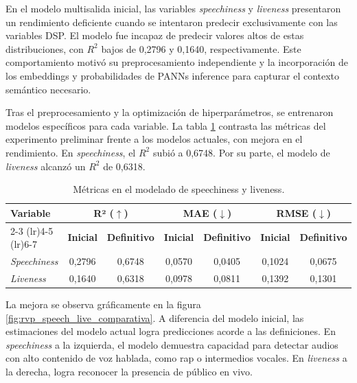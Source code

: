 En el modelo multisalida inicial, las variables \textit{speechiness} y \textit{liveness} presentaron un rendimiento deficiente cuando se intentaron predecir exclusivamente con las variables DSP. El modelo fue incapaz de predecir valores altos de estas distribuciones, con $R^2$ bajos de 0,2796 y 0,1640, respectivamente. Este comportamiento motivó su preprocesamiento independiente y la incorporación de los embeddings y probabilidades de PANNs inference para capturar el contexto semántico necesario.

Tras el preprocesamiento y la optimización de hiperparámetros, se entrenaron modelos específicos para cada variable. La tabla \ref{tab:comparativa_speech_live} contrasta las métricas del experimento preliminar frente a los modelos actuales, con mejora en el rendimiento. En \textit{speechiness}, el $R^2$ subió a 0,6748. Por su parte, el modelo de \textit{liveness} alcanzó un $R^2$ de 0,6318. 

\begin{table}[htpb]
    \centering
    \caption{Métricas en el modelado de speechiness y liveness.}
    \label{tab:comparativa_speech_live}
    \renewcommand{\arraystretch}{1.2}
    \small
    \begin{tabular}{@{}lcccccc@{}}
        \toprule
        \multirow{2}{*}{\textbf{Variable}} & \multicolumn{2}{c}{\textbf{R² ($\uparrow$)}} & \multicolumn{2}{c}{\textbf{MAE ($\downarrow$)}} & \multicolumn{2}{c}{\textbf{RMSE ($\downarrow$)}} \\
        \cmidrule(lr){2-3} \cmidrule(lr){4-5} \cmidrule(lr){6-7}
        & \textbf{Inicial} & \textbf{Definitivo} & \textbf{Inicial} & \textbf{Definitivo} & \textbf{Inicial} & \textbf{Definitivo} \\
        \midrule
        \textit{Speechiness} & 0,2796 & 0,6748 & 0,0570 & 0,0405 & 0,1024 & 0,0675 \\
        \textit{Liveness}    & 0,1640 & 0,6318 & 0,0978 & 0,0811 & 0,1392 & 0,1301 \\
        \bottomrule
    \end{tabular}
\end{table}

La mejora se observa gráficamente en la figura \ref{fig:rvp_speech_live_comparativa}. A diferencia del modelo inicial, las estimaciones del modelo actual logra predicciones acorde a las definiciones. En \textit{speechiness} a la izquierda, el modelo demuestra capacidad para detectar audios con alto contenido de voz hablada, como rap o intermedios vocales. En \textit{liveness} a la derecha, logra reconocer la presencia de público en vivo.

